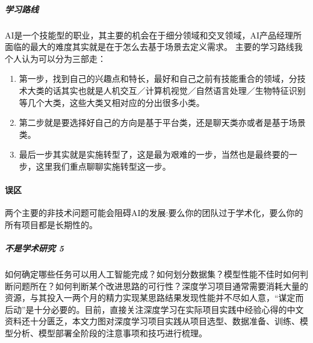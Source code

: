 \documentclass[letterpaper,10pt,english]{sphinxmanual}
\begin{document}
\subparagraph{学习路线}
\label{\detokenize{chapter_introduction/AI_PM:id26}}
AI是一个技能型的职业，其主要的机会在于细分领域和交叉领域，AI产品经理所面临的最大的难度其实就是在于怎么去基于场景去定义需求。
主要的学习路线我个人认为可以分为三部走：
\begin{enumerate}
%
\item {} 
第一步，找到自己的兴趣点和特长，最好和自己之前有技能重合的领域，分技术大类的话其实也就是人机交互／计算机视觉／自然语言处理／生物特征识别等几个大类，这些大类又相对应的分出很多小类。

\item {} 
第二步就是要选择好自己的方向是基于平台类，还是聊天类亦或者是基于场景类。

\item {} 
最后一步其实就是实施转型了，这是最为艰难的一步，当然也是最终要的一步，这里我们重点聊聊实施转型这一步。

\end{enumerate}


\paragraph{误区}
\label{\detokenize{chapter_introduction/AI_PM:id27}}
两个主要的非技术问题可能会阻碍AI的发展:要么你的团队过于学术化，要么你的所有项目都是长期性的。%
\begin{footnote}[296]\sphinxAtStartFootnote
{}
%
\end{footnote}


\subparagraph{不是学术研究 5\sphinxfootnotemark[297]}
\label{\detokenize{chapter_introduction/AI_PM:id28}}%
\begin{footnotetext}[297]\sphinxAtStartFootnote
{}
%
\end{footnotetext}\ignorespaces 
如何确定哪些任务可以用人工智能完成？如何划分数据集？模型性能不佳时如何判断问题所在？如何判断某个改进思路的可行性？深度学习项目通常需要消耗大量的资源，与其投入一两个月的精力实现某思路结果发现性能并不尽如人意，“谋定而后动”是十分必要的。目前，直接关注深度学习在实际项目实践中经验心得的中文资料还十分匮乏，本文力图对深度学习项目实践从项目选型、数据准备、训练、模型分析、模型部署全阶段的注意事项和技巧进行梳理。
\end{document}
